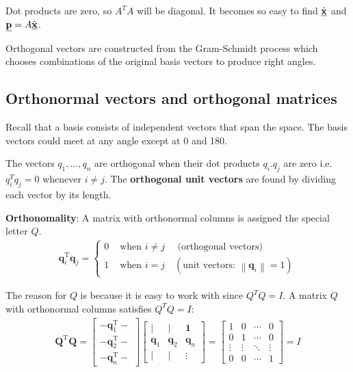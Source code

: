 \documentclass[10pt,a4paper]{article}
\begin{document}
Dot products are zero, so $A^T A$ will be diagonal. It becomes so easy to find
$\hat{\textbf{\underline{x}}}$ and $\textbf{\underline{p}} = A\hat{\textbf{\underline{x}}}$. 

Orthogonal vectors are constructed from the Gram-Schmidt process which chooses combinations of the original basis vectors to produce right angles.

\subsection{Orthonormal vectors and orthogonal matrices}

Recall that a basis consists of independent vectors that span the space. The basis vectors could
meet at any angle except at 0 and 180.

The vectors $q_1,\dots,q_n$ are orthogonal when their dot products $q_i.q_j$ are zero i.e. $q_i^Tq_j
= 0$ whenever $i \neq j$. The \textbf{orthogonal unit vectors} are found by dividing each vector by
its length.

\begin{tcolorbox}[breakable,colback=white]
\textbf{Orthonomality}: A matrix with orthonormal columns is assigned the special letter $Q$. 
\begin{align*}
    \boldsymbol{q}_{i}^{\mathrm{T}} \boldsymbol{q}_{j}=\left\{\begin{array}{ll}
        0 & \text { when } i \neq j \quad \text { (orthogonal vectors) } \\
        1 & \text { when } i=j \quad\left(\text {unit vectors: }\left\|\boldsymbol{q}_{i}\right\|=1\right)
        \end{array}\right.
\end{align*}
\end{tcolorbox}

The reason for $Q$ is because it is easy to work with since $Q^T  Q  = I$. A matrix $Q$ with
orthonormal columns satisfies $Q^TQ=I$:
\begin{align*}
    \boldsymbol{Q}^{\mathrm{T}} \boldsymbol{Q}=\left[\begin{array}{l}
        -\boldsymbol{q}_{1}^{\mathrm{T}}- \\
        -\boldsymbol{q}_{2}^{\mathrm{T}}- \\
        -\boldsymbol{q}_{n}^{\mathrm{T}}-
        \end{array}\right]\left[\begin{array}{ccc}
        \mid & \mid & \mathbf{1} \\
        \boldsymbol{q}_{1} & \boldsymbol{q}_{2} & \boldsymbol{q}_{n} \\
        \mid & \mid & \vdots
        \end{array}\right]=\left[\begin{array}{cccc}
        1 & 0 & \cdots & 0 \\
        0 & 1 & \cdots & 0 \\
        \vdots & \vdots & \ddots & \vdots \\
        0 & 0 & \cdots & 1
        \end{array}\right]=I
\end{align*}
\end{document}
